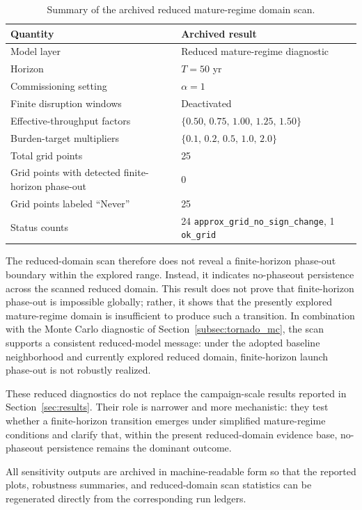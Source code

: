 \documentclass[12pt]{article}
\begin{document}
\begin{table}[htbp]
	\centering
	\caption{Summary of the archived reduced mature-regime domain scan.}
	\label{tab:phaseout_scan_summary}
	\small
	\begin{tabular}{ll}
		\hline
		Quantity & Archived result \\
		\hline
		Model layer & Reduced mature-regime diagnostic \\
		Horizon & \(T=50\) yr \\
		Commissioning setting & \(\alpha=1\) \\
		Finite disruption windows & Deactivated \\
		Effective-throughput factors & \(\{0.50,\,0.75,\,1.00,\,1.25,\,1.50\}\) \\
		Burden-target multipliers & \(\{0.1,\,0.2,\,0.5,\,1.0,\,2.0\}\) \\
		Total grid points & 25 \\
		Grid points with detected finite-horizon phase-out & 0 \\
		Grid points labeled ``Never'' & 25 \\
		Status counts & 24 \texttt{approx\_grid\_no\_sign\_change}, 1 \texttt{ok\_grid} \\
		\hline
	\end{tabular}
\end{table}

The reduced-domain scan therefore does not reveal a finite-horizon phase-out boundary within the explored range. Instead, it indicates no-phaseout persistence across the scanned reduced domain. This result does not prove that finite-horizon phase-out is impossible globally; rather, it shows that the presently explored mature-regime domain is insufficient to produce such a transition. In combination with the Monte Carlo diagnostic of Section~\ref{subsec:tornado_mc}, the scan supports a consistent reduced-model message: under the adopted baseline neighborhood and currently explored reduced domain, finite-horizon launch phase-out is not robustly realized.

These reduced diagnostics do not replace the campaign-scale results reported in Section~\ref{sec:results}. Their role is narrower and more mechanistic: they test whether a finite-horizon transition emerges under simplified mature-regime conditions and clarify that, within the present reduced-domain evidence base, no-phaseout persistence remains the dominant outcome.

All sensitivity outputs are archived in machine-readable form so that the reported plots, robustness summaries, and reduced-domain scan statistics can be regenerated directly from the corresponding run ledgers.
\end{document}
